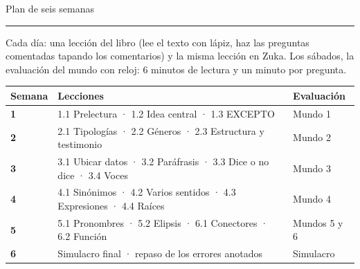 \clearpage\renewcommand{\zuka@mundoactual}{Plan de estudio}
{\sffamily\fontsize{26}{30}\selectfont\firalight Plan de seis semanas\par}\vspace{2pt}
{\color{zlime}\rule{18mm}{1.6pt}}\par\vspace{6pt}
{\small Cada día: una lección del libro (lee el texto con lápiz, haz las preguntas comentadas tapando los comentarios) y
la misma lección en Zuka. Los sábados, la evaluación del mundo con reloj: 6 minutos de lectura y un minuto por pregunta.\par}
\vspace{6pt}
\begin{center}\small
\begin{tabularx}{\linewidth}{@{}>{\sffamily\bfseries\color{zolive}}lX>{\raggedleft\arraybackslash}p{24mm}@{}}
\toprule
\textbf{Semana} & \textbf{Lecciones} & \textbf{Evaluación}\\\midrule
1 & 1.1 Prelectura · 1.2 Idea central · 1.3 EXCEPTO & Mundo 1\\
2 & 2.1 Tipologías · 2.2 Géneros · 2.3 Estructura y testimonio & Mundo 2\\
3 & 3.1 Ubicar datos · 3.2 Paráfrasis · 3.3 Dice o no dice · 3.4 Voces & Mundo 3\\
4 & 4.1 Sinónimos · 4.2 Varios sentidos · 4.3 Expresiones · 4.4 Raíces & Mundo 4\\
5 & 5.1 Pronombres · 5.2 Elipsis · 6.1 Conectores · 6.2 Función & Mundos 5 y 6\\
6 & Simulacro final · repaso de los errores anotados & Simulacro\\
\bottomrule
\end{tabularx}
\end{center}

